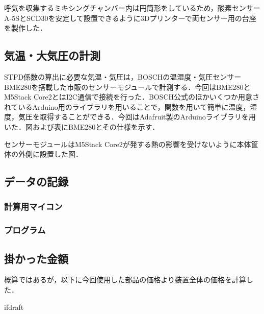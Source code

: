 呼気を収集するミキシングチャンバー内は円筒形をしているため，酸素センサーA-5SとSCD30を安定して設置できるように3Dプリンターで両センサー用の台座を製作した．



\subsection{気温・大気圧の計測}

STPD係数の算出に必要な気温・気圧は，BOSCHの温湿度・気圧センサーBME280を搭載した市販のセンサーモジュールで計測する．今回はBME280とM5Stack Core2とはI2C通信で接続を行った．BOSCH公式のほかいくつか用意されているArduino用のライブラリを用いることで，関数を用いて簡単に温度，湿度，気圧を取得することができる．今回はAdafruit製のArduinoライブラリを用いた．図および表にBME280とその仕様を示す．

センサーモジュールはM5Stack Core2が発する熱の影響を受けないように本体筐体の外側に設置した図．

\subsection{データの記録}

\subsubsection{計算用マイコン}

\subsubsection{プログラム}

\subsection{掛かった金額}

概算ではあるが，以下に今回使用した部品の価格より装置全体の価格を計算した．

\expandafter\ifx\csname ifdraft\endcsname\relax
  
\fi
